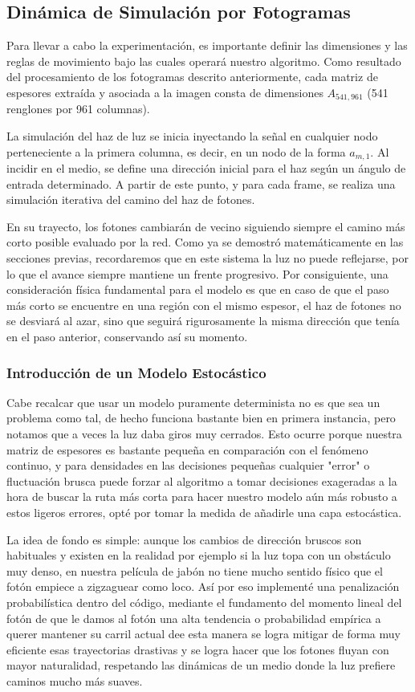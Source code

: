 \subsection{Dinámica de Simulación por Fotogramas}

Para llevar a cabo la experimentación, es importante definir las dimensiones y las reglas de movimiento bajo las cuales operará nuestro algoritmo. Como resultado del procesamiento de los fotogramas descrito anteriormente, cada matriz de espesores extraída y asociada a la imagen consta de dimensiones $A_{541, 961}$ (541 renglones por 961 columnas). 

La simulación del haz de luz se inicia inyectando la señal en cualquier nodo perteneciente a la primera columna, es decir, en un nodo de la forma $a_{m,1}$. Al incidir en el medio, se define una dirección inicial para el haz según un ángulo de entrada determinado. A partir de este punto, y para cada frame, se realiza una simulación iterativa del camino del haz de fotones.

En su trayecto, los fotones cambiarán de vecino siguiendo siempre el camino más corto posible evaluado por la red. Como ya se demostró matemáticamente en las secciones previas, recordaremos que en este sistema la luz no puede reflejarse, por lo que el avance siempre mantiene un frente progresivo. Por consiguiente, una consideración física fundamental para el modelo es que en caso de que el paso más corto se encuentre en una región con el mismo espesor, el haz de fotones no se desviará al azar, sino que seguirá rigurosamente la misma dirección que tenía en el paso anterior, conservando así su momento.

\subsubsection{Introducción de un Modelo Estocástico}
Cabe recalcar que usar un modelo puramente determinista no es que sea un problema como tal, de hecho funciona bastante bien en primera instancia, pero notamos que a veces la luz daba giros muy cerrados. Esto ocurre porque nuestra matriz de espesores es bastante pequeña en comparación con el fenómeno continuo, y para densidades en las decisiones pequeñas cualquier "error" o fluctuación brusca puede forzar al algoritmo a tomar decisiones exageradas a la hora de buscar la ruta más corta para hacer nuestro modelo aún más robusto a estos ligeros errores, opté por tomar la medida de añadirle una capa estocástica.

La idea de fondo es simple: aunque los cambios de dirección bruscos son habituales y existen en la realidad por ejemplo si la luz topa con un obstáculo muy denso, en nuestra película de jabón no tiene mucho sentido físico que el fotón empiece a zigzaguear como loco. Así por eso implementé una penalización probabilística dentro del código, mediante el fundamento del momento lineal del fotón de que le damos al fotón una alta tendencia o probabilidad empírica a querer mantener su carril actual dee esta manera se logra mitigar de forma muy eficiente esas trayectorias drastivas y se logra hacer que los fotones fluyan con mayor naturalidad, respetando las dinámicas de un medio donde la luz prefiere caminos mucho más suaves.

